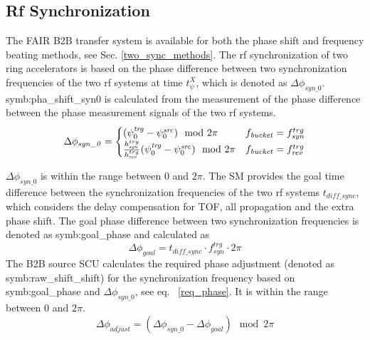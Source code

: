 \subsection{Rf Synchronization}
The FAIR B2B transfer system is available for both the phase shift and frequency beating methods, see Sec. \ref{two_sync_methods}. The rf synchronization of two ring accelerators is based on the phase difference between two synchronization frequencies of the two rf systems at time $t_\psi^X$, which is denoted as $\Delta \phi_\mathit{syn\_0}$. \gls{symb:pha_shift_syn0} is calculated from the measurement of the phase difference between the phase measurement signals of the two rf systems. 
\begin{eqnarray}
\label{phase_shift_syn}
\Delta \phi_\mathit{syn\_0}=
\begin{cases}
(\psi^\mathit{trg}_0-\psi^\mathit{src}_0) \mod 2\pi
&f_{\mathit{bucket}}=f_{\mathit{syn}}^{trg}\cr

\frac{h_{\mathit{syn}}^{trg}}{h_{\mathit{rev}}^{trg}}(\psi^\mathit{trg}_0-\psi^\mathit{src}_0) \mod 2\pi
&f_{\mathit{bucket}}=f_{\mathit{rev}}^{trg}
\end{cases}
\end{eqnarray}

$\Delta \phi_\mathit{syn\_0}$ is within the range between $0$ and $2\pi$. The SM provides the goal time difference between the synchronization frequencies of the two rf systems $t_{\mathit{diff\_sync}}$, which considers the delay compensation for TOF, all propagation and the extra phase shift. The goal phase difference between two synchronization frequencies is denoted as \gls{symb:goal_phase} and calculated as 
\begin{equation}
\Delta \phi_\mathit{goal}= t_{\mathit{diff\_sync}}  \cdot f_\mathit{syn}^\mathit{trg}\cdot 2\pi 
\end{equation}
The B2B source SCU calculates the required phase adjustment (denoted as \gls{symb:raw_shift_shift}) for the synchronization frequency based on \gls{symb:goal_phase} and $\Delta \phi_\mathit{syn\_0}$, see eq. ~\ref{req_phase}. It is within the range between $0$ and $2\pi$.
\begin{equation}
\Delta \phi_\mathit{adjust}= (\Delta \phi_\mathit{syn\_0}-\Delta \phi_\mathit{goal}) \mod 2\pi 
\label{req_phase}
\end{equation}


